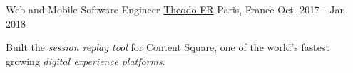 \begin{cventries}
  \cventry
    {Web and Mobile Software Engineer} %
    {\href{https://www.theodo.fr/}{Theodo FR}} %
    {Paris, France} %
    {Oct. 2017 - Jan. 2018} %
    {
      \begin{cvitems} %
        \item Built the \textit{session replay tool} for \href{https://contentsquare.com/}{Content Square}, one of the world's fastest growing \textit{digital experience platforms}.
      \end{cvitems}
    }
    {}


\end{cventries}
